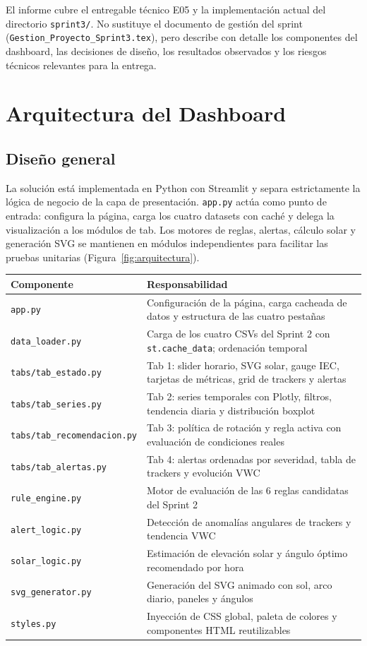 \documentclass[11pt,a4paper]{article}
\begin{document}
El informe cubre el entregable técnico E05 y la implementación actual del directorio
\texttt{sprint3/}. No sustituye el documento de gestión del sprint (\texttt{Gestion\_Proyecto\_Sprint3.tex}),
pero describe con detalle los componentes del dashboard, las decisiones de diseño, los
resultados observados y los riesgos técnicos relevantes para la entrega.

\section{Arquitectura del Dashboard}

\subsection{Diseño general}

La solución está implementada en Python con Streamlit y separa estrictamente la lógica
de negocio de la capa de presentación. \texttt{app.py} actúa como punto de entrada: configura
la página, carga los cuatro datasets con caché y delega la visualización a los módulos de
tab. Los motores de reglas, alertas, cálculo solar y generación SVG se mantienen en módulos
independientes para facilitar las pruebas unitarias (Figura~\ref{fig:arquitectura}).

\begin{longtable}{p{} p{}}
\toprule
\textbf{Componente} & \textbf{Responsabilidad} \\
\midrule
\texttt{app.py} & Configuración de la página, carga cacheada de datos y estructura de las cuatro pestañas \\
\texttt{data\_loader.py} & Carga de los cuatro CSVs del Sprint 2 con \texttt{st.cache\_data}; ordenación temporal \\
\texttt{tabs/tab\_estado.py} & Tab 1: slider horario, SVG solar, gauge IEC, tarjetas de métricas, grid de trackers y alertas \\
\texttt{tabs/tab\_series.py} & Tab 2: series temporales con Plotly, filtros, tendencia diaria y distribución boxplot \\
\texttt{tabs/tab\_recomendacion.py} & Tab 3: política de rotación y regla activa con evaluación de condiciones reales \\
\texttt{tabs/tab\_alertas.py} & Tab 4: alertas ordenadas por severidad, tabla de trackers y evolución VWC \\
\texttt{rule\_engine.py} & Motor de evaluación de las 6 reglas candidatas del Sprint 2 \\
\texttt{alert\_logic.py} & Detección de anomalías angulares de trackers y tendencia VWC \\
\texttt{solar\_logic.py} & Estimación de elevación solar y ángulo óptimo recomendado por hora \\
\texttt{svg\_generator.py} & Generación del SVG animado con sol, arco diario, paneles y ángulos \\
\texttt{styles.py} & Inyección de CSS global, paleta de colores y componentes HTML reutilizables \\
\bottomrule
\end{longtable}
\end{document}
